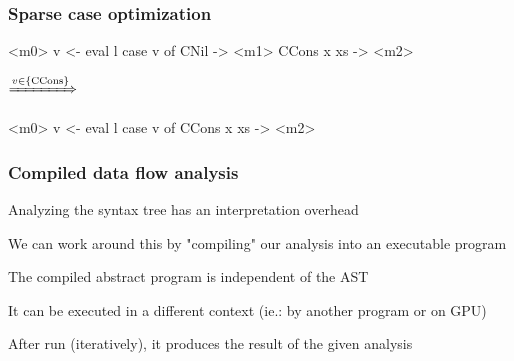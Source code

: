 \documentclass[bigger]{beamer}
\begin{document}

\begin{frame}[fragile]
\frametitle{Sparse case optimization}

\begin{center}
	\begin{minipage}{0.40\textwidth}
		\begin{haskellcode}
			<m0>
			v <- eval l
			case v of
			 CNil       -> <m1>
			 CCons x xs -> <m2>
		\end{haskellcode}
	\end{minipage}
	$\xRightarrow{v \in \{ \text{CCons}\}}$
	\hfill
	\begin{minipage}{0.40\textwidth}
		\begin{haskellcode}
			<m0>
			v <- eval l
			case v of
			 CCons x xs -> <m2>
		\end{haskellcode}
	\end{minipage}
\end{center}

\end{frame}


\begin{frame}
\frametitle{Compiled data flow analysis}

\begin{vfitemize}
	\item Analyzing the syntax tree has an interpretation overhead
	\item We can work around this by "compiling" our analysis into an executable program
	\item The compiled abstract program is independent of the AST
	\item It can be executed in a different context (ie.: by another program or on GPU)
	\item After run (iteratively), it produces the result of the given analysis
\end{vfitemize}
\end{frame}
\end{document}
